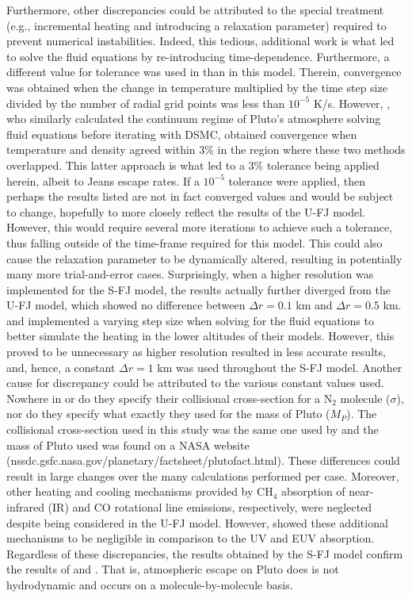 \documentclass[times,12]{article}
\begin{document}
\indent Furthermore, other discrepancies could be attributed to the special treatment (e.g., incremental heating and introducing a relaxation parameter) required to prevent numerical instabilities. Indeed, this tedious, additional work is what led \cite{Erwin2013} to solve the fluid equations by re-introducing time-dependence. Furthermore, a different value for tolerance was used in \cite{Erwin2013} than in this model. Therein, convergence was obtained when the change in temperature multiplied by the time step size divided by the number of radial grid points was less than $10^{-5}$ K/s. However, \cite{Tucker2012}, who similarly calculated the continuum regime of Pluto's atmosphere solving fluid equations before iterating with DSMC, obtained convergence when temperature and density agreed within 3$\%$ in the region where these two methods overlapped. This latter approach is what led to a 3$\%$ tolerance being applied herein, albeit to Jeans escape rates. If a $10^{-5}$ tolerance were applied, then perhaps the results listed are not in fact converged values and would be subject to change, hopefully to more closely reflect the results of the U-FJ model. However, this would require several more iterations to achieve such a tolerance, thus falling outside of the time-frame required for this model. This could also cause the relaxation parameter to be dynamically altered, resulting in potentially many more trial-and-error cases. Surprisingly, when a higher resolution was implemented for the S-FJ model, the results actually further diverged from the U-FJ model, which showed no difference between $\Delta r=0.1$ km and $\Delta r = 0.5$ km. \cite{Tucker2012} and \cite{Erwin2013} implemented a varying step size when solving for the fluid equations to better simulate the heating in the lower altitudes of their models. However, this proved to be unnecessary as higher resolution resulted in less accurate results, and, hence, a constant $\Delta r=1$ km was used throughout the S-FJ model. Another cause for discrepancy could be attributed to the various constant values used. Nowhere in \cite{Tucker2012} or \cite{Erwin2013} do they specify their collisional cross-section for a N$_2$ molecule ($\sigma$), nor do they specify what exactly they used for the mass of Pluto ($M_P$). The collisional cross-section used in this study was the same one used by \cite{Johnson2015} and the mass of Pluto used was found on a NASA website (nssdc.gsfc.nasa.gov/planetary/factsheet/plutofact.html). These differences could result in large changes over the many calculations performed per case. Moreover, other heating and cooling mechanisms provided by CH$_4$ absorption of near-infrared (IR) and CO rotational line emissions, respectively, were neglected despite being considered in the U-FJ model. However, \cite{Erwin2013} showed these additional mechanisms to be negligible in comparison to the UV and EUV absorption. Regardless of these discrepancies, the results obtained by the S-FJ model confirm the results of \cite{Tucker2012} and \cite{Erwin2013}. That is, atmospheric escape on Pluto does is not hydrodynamic and occurs on a molecule-by-molecule basis.\\
\end{document}
